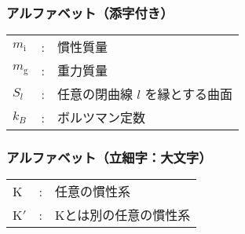     \subsubsection*{アルファベット（添字付き）}
    \begin{tabular}{lll}
        $m_{\mathrm{i}}$        &:  & 慣性質量                                                              \\
        $m_{\mathrm{g}}$        &:  & 重力質量                                                              \\
        $S_{l}$                 &:  & 任意の閉曲線 $l$ を縁とする曲面                   \\
        $k_{B}$                 &:  & ボルツマン定数                                                        %
    \end{tabular}



    \subsubsection*{アルファベット（立細字：大文字）}
    \begin{tabular}{lll}
        K                       &:  & 任意の慣性系                                                          \\
        K$'$                    &:  & Kとは別の任意の慣性系                                                 %
    \end{tabular}


